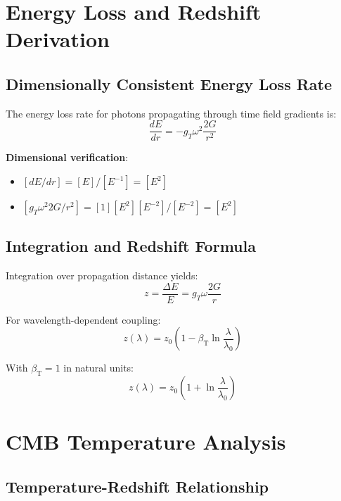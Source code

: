 \documentclass[12pt,a4paper]{article}
\newcommand{\betaT}{\beta_{\text{T}}}
\begin{document}
	\section{Energy Loss and Redshift Derivation}
	\label{sec:energy_loss}
	
	\subsection{Dimensionally Consistent Energy Loss Rate}
	\label{subsec:energy_loss_rate}
	
	The energy loss rate for photons propagating through time field gradients is:
	\begin{equation}
		\frac{dE}{dr} = -g_T \omega^2 \frac{2G}{r^2}
	\end{equation}
	
	\textbf{Dimensional verification}:
	\begin{itemize}
		\item $[dE/dr] = [E]/[E^{-1}] = [E^2]$
		\item $[g_T \omega^2 2G/r^2] = [1][E^2][E^{-2}]/[E^{-2}] = [E^2]$ \checkmark
	\end{itemize}
	
	\subsection{Integration and Redshift Formula}
	\label{subsec:redshift_formula}
	
	Integration over propagation distance yields:
	\begin{equation}
		z = \frac{\Delta E}{E} = g_T \omega \frac{2G}{r}
	\end{equation}
	
	For wavelength-dependent coupling:
	\begin{equation}
		z(\lambda) = z_0\left(1 - \betaT \ln\frac{\lambda}{\lambda_0}\right)
	\end{equation}
	
	With $\betaT = 1$ in natural units:
	\begin{equation}
		\boxed{z(\lambda) = z_0\left(1 + \ln\frac{\lambda}{\lambda_0}\right)}
	\end{equation}
	
	\section{CMB Temperature Analysis}
	\label{sec:cmb_analysis}
	
	\subsection{Temperature-Redshift Relationship}
	\label{subsec:temp_redshift}
	
\end{document}
